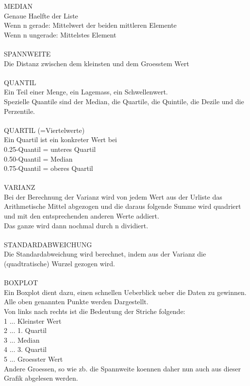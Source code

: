 \documentclass[12pt]{article}
\begin{document}
MEDIAN \\
    Genaue Haelfte der Liste \\
        Wenn n gerade: Mittelwert der beiden mittleren Elemente \\
        Wenn n ungerade: Mittelstes Element \\ \\

SPANNWEITE \\
    Die Distanz zwischen dem kleinsten und dem Groesstem Wert
\\ \\
QUANTIL \\
    Ein Teil einer Menge, ein Lagemass, ein Schwellenwert. \\
    Spezielle Quantile sind der Median, die Quartile, die Quintile, die Dezile und die Perzentile.
\\ \\

QUARTIL (=Viertelwerte) \\
     Ein Quartil ist ein konkreter Wert bei \\
        0.25-Quantil = unteres Quartil \\ 
        0.50-Quantil = Median \\
        0.75-Quantil = oberes Quartil \\ \\

VARIANZ \\
    Bei der Berechnung der Varianz wird von jedem Wert aus der Urliste das Arithmetische Mittel abgezogen und
    die daraus folgende Summe wird quadriert und mit den entsprechenden anderen Werte addiert. \\
    Das ganze wird dann nochmal durch n dividiert. \\ \\

STANDARDABWEICHUNG \\
    Die Standardabweichung wird berechnet, indem aus der Varianz die (quadtratische) Wurzel gezogen wird.
\\ \\
BOXPLOT \\
    Ein Boxplot dient dazu, einen schnellen Ueberblick ueber die Daten zu gewinnen.
    Alle oben genannten Punkte werden Dargestellt. \\
    Von links nach rechts ist die Bedeutung der Striche folgende: \\
        1 ... Kleinster Wert \\
        2 ... 1. Quartil \\
        3 ... Median \\
        4 ... 3. Quartil \\
        5 ... Groesster Wert \\
    Andere Groessen, so wie zb. die Spannweite koennen daher nun auch aus dieser Grafik abgelesen werden.
\end{document}
